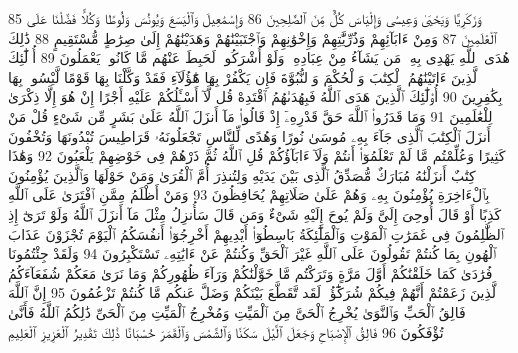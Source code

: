 {\tiny\colorbox{cl_aya}{85}} وَزَكَرِيَّا وَيَحْيَىٰ وَعِيسَىٰ وَإِلْيَاسَ كُلٌّ مِّنَ ٱلصَّٰلِحِينَ
{\tiny\colorbox{cl_aya}{86}} وَإِسْمَٰعِيلَ وَٱلْيَسَعَ وَيُونُسَ وَلُوطًا وَكُلًّا فَضَّلْنَا عَلَى ٱلْعَٰلَمِينَ
{\tiny\colorbox{cl_aya}{87}} وَمِنْ ءَابَآئِهِمْ وَذُرِّيَّٰتِهِمْ وَإِخْوَٰنِهِمْ وَٱجْتَبَيْنَٰهُمْ وَهَدَيْنَٰهُمْ إِلَىٰ صِرَٰطٍ مُّسْتَقِيمٍ
{\tiny\colorbox{cl_aya}{88}} ذَٰلِكَ هُدَى ٱللَّهِ يَهْدِى بِهِۦ مَن يَشَآءُ مِنْ عِبَادِهِۦ وَلَوْ أَشْرَكُوا۟ لَحَبِطَ عَنْهُم مَّا كَانُوا۟ يَعْمَلُونَ
{\tiny\colorbox{cl_aya}{89}} أُو۟لَٰٓئِكَ ٱلَّذِينَ ءَاتَيْنَٰهُمُ ٱلْكِتَٰبَ وَٱلْحُكْمَ وَٱلنُّبُوَّةَ فَإِن يَكْفُرْ بِهَا هَٰٓؤُلَآءِ فَقَدْ وَكَّلْنَا بِهَا قَوْمًا لَّيْسُوا۟ بِهَا بِكَٰفِرِينَ
{\tiny\colorbox{cl_aya}{90}} أُو۟لَٰٓئِكَ ٱلَّذِينَ هَدَى ٱللَّهُ فَبِهُدَىٰهُمُ ٱقْتَدِهْ قُل لَّآ أَسْـَٔلُكُمْ عَلَيْهِ أَجْرًا إِنْ هُوَ إِلَّا ذِكْرَىٰ لِلْعَٰلَمِينَ
{\tiny\colorbox{cl_aya}{91}} وَمَا قَدَرُوا۟ ٱللَّهَ حَقَّ قَدْرِهِۦٓ إِذْ قَالُوا۟ مَآ أَنزَلَ ٱللَّهُ عَلَىٰ بَشَرٍ مِّن شَىْءٍ قُلْ مَنْ أَنزَلَ ٱلْكِتَٰبَ ٱلَّذِى جَآءَ بِهِۦ مُوسَىٰ نُورًا وَهُدًى لِّلنَّاسِ تَجْعَلُونَهُۥ قَرَاطِيسَ تُبْدُونَهَا وَتُخْفُونَ كَثِيرًا وَعُلِّمْتُم مَّا لَمْ تَعْلَمُوٓا۟ أَنتُمْ وَلَآ ءَابَآؤُكُمْ قُلِ ٱللَّهُ ثُمَّ ذَرْهُمْ فِى خَوْضِهِمْ يَلْعَبُونَ
{\tiny\colorbox{cl_aya}{92}} وَهَٰذَا كِتَٰبٌ أَنزَلْنَٰهُ مُبَارَكٌ مُّصَدِّقُ ٱلَّذِى بَيْنَ يَدَيْهِ وَلِتُنذِرَ أُمَّ ٱلْقُرَىٰ وَمَنْ حَوْلَهَا وَٱلَّذِينَ يُؤْمِنُونَ بِٱلْءَاخِرَةِ يُؤْمِنُونَ بِهِۦ وَهُمْ عَلَىٰ صَلَاتِهِمْ يُحَافِظُونَ
{\tiny\colorbox{cl_aya}{93}} وَمَنْ أَظْلَمُ مِمَّنِ ٱفْتَرَىٰ عَلَى ٱللَّهِ كَذِبًا أَوْ قَالَ أُوحِىَ إِلَىَّ وَلَمْ يُوحَ إِلَيْهِ شَىْءٌ وَمَن قَالَ سَأُنزِلُ مِثْلَ مَآ أَنزَلَ ٱللَّهُ وَلَوْ تَرَىٰٓ إِذِ ٱلظَّٰلِمُونَ فِى غَمَرَٰتِ ٱلْمَوْتِ وَٱلْمَلَٰٓئِكَةُ بَاسِطُوٓا۟ أَيْدِيهِمْ أَخْرِجُوٓا۟ أَنفُسَكُمُ ٱلْيَوْمَ تُجْزَوْنَ عَذَابَ ٱلْهُونِ بِمَا كُنتُمْ تَقُولُونَ عَلَى ٱللَّهِ غَيْرَ ٱلْحَقِّ وَكُنتُمْ عَنْ ءَايَٰتِهِۦ تَسْتَكْبِرُونَ
{\tiny\colorbox{cl_aya}{94}} وَلَقَدْ جِئْتُمُونَا فُرَٰدَىٰ كَمَا خَلَقْنَٰكُمْ أَوَّلَ مَرَّةٍ وَتَرَكْتُم مَّا خَوَّلْنَٰكُمْ وَرَآءَ ظُهُورِكُمْ وَمَا نَرَىٰ مَعَكُمْ شُفَعَآءَكُمُ ٱلَّذِينَ زَعَمْتُمْ أَنَّهُمْ فِيكُمْ شُرَكَٰٓؤُا۟ لَقَد تَّقَطَّعَ بَيْنَكُمْ وَضَلَّ عَنكُم مَّا كُنتُمْ تَزْعُمُونَ
{\tiny\colorbox{cl_aya}{95}} إِنَّ ٱللَّهَ فَالِقُ ٱلْحَبِّ وَٱلنَّوَىٰ يُخْرِجُ ٱلْحَىَّ مِنَ ٱلْمَيِّتِ وَمُخْرِجُ ٱلْمَيِّتِ مِنَ ٱلْحَىِّ ذَٰلِكُمُ ٱللَّهُ فَأَنَّىٰ تُؤْفَكُونَ
{\tiny\colorbox{cl_aya}{96}} فَالِقُ ٱلْإِصْبَاحِ وَجَعَلَ ٱلَّيْلَ سَكَنًا وَٱلشَّمْسَ وَٱلْقَمَرَ حُسْبَانًا ذَٰلِكَ تَقْدِيرُ ٱلْعَزِيزِ ٱلْعَلِيمِ
